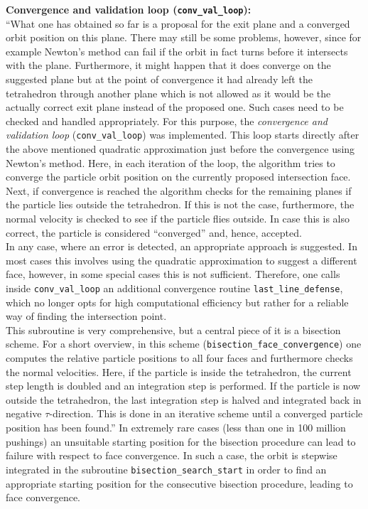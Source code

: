 \documentclass{TheMartianReport}
\begin{document}
\textbf{Convergence and validation loop (\texttt{conv\_val\_loop}):}\\
``What one has obtained so far is a proposal for the exit plane and a converged orbit position on this plane. There may still be some problems, however, since for example Newton's method can fail if the orbit in fact turns before it intersects with the plane. Furthermore, it might happen that it does converge on the suggested plane but at the point of convergence it had already left the tetrahedron through another plane which is not allowed as it would be the actually correct exit plane instead of the proposed one. Such cases need to be checked and handled appropriately. For this purpose, the \textit{convergence and validation loop} (\texttt{conv\_val\_loop}) was implemented. This loop starts directly after the above mentioned quadratic approximation just before the convergence using Newton's method. Here, in each iteration of the loop, the algorithm tries to converge the particle orbit position on the currently proposed intersection face. Next, if convergence is reached the algorithm checks for the remaining planes if the particle lies outside the tetrahedron. If this is not the case, furthermore, the normal velocity is checked to see if the particle flies outside. In case this is also correct, the particle is considered ``converged'' and, hence, accepted. \\
%
In any case, where an error is detected, an appropriate approach is suggested. In most cases this involves using the quadratic approximation to suggest a different face, however, in some special cases this is not sufficient. Therefore, one calls inside \texttt{conv\_val\_loop} an additional convergence routine \texttt{last\_line\_defense}, which no longer opts for high computational efficiency but rather for a reliable way of finding the intersection point. \\
%
This subroutine is very comprehensive, but a central piece of it is a bisection scheme. For a short overview, in this scheme (\texttt{bisection\_face\_convergence}) one computes the relative particle positions to all four faces and furthermore checks the normal velocities. Here, if the particle is inside the tetrahedron, the current step length is doubled and an integration step is performed. If the particle is now outside the tetrahedron, the last integration step is halved and integrated back in negative $\tau$-direction. This is done in an iterative scheme until a converged particle position has been found.''\cite{bauer_master_2020} In extremely rare cases (less than one in 100 million pushings) an unsuitable starting position for the bisection procedure can lead to failure with respect to face convergence.  In such a case, the orbit is stepwise integrated in the subroutine \texttt{bisection\_search\_start} in order to find an appropriate starting position for the consecutive bisection procedure, leading to face convergence.\\
\end{document}
